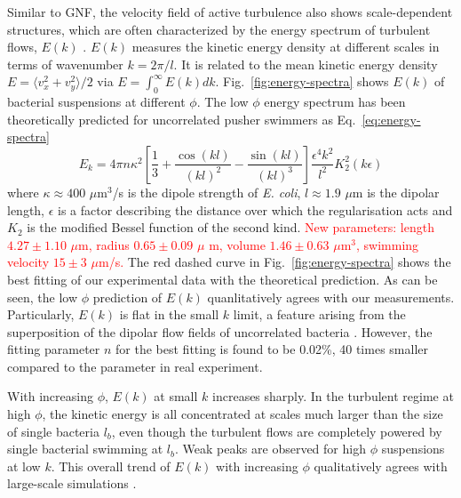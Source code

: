 \documentclass[twocolumn,aps,prx,amsmath,amssymb,longbibliography]{revtex4-2}
\begin{document}
Similar to GNF, the velocity field of active turbulence also shows scale-dependent structures, which are often characterized by the energy spectrum of turbulent flows, $E(k)$ \cite{Liu2020}. $E(k)$ measures the kinetic energy density at different scales in terms of wavenumber $k = 2\pi/l$. It is related to the mean kinetic energy density $E = \langle v_x^2 + v_y^2 \rangle/2$ via $E = \int_0^\infty E(k)dk$. Fig.~\ref{fig:energy-spectra} shows $E(k)$ of bacterial suspensions at different $\phi$. The low $\phi$ energy spectrum has been theoretically predicted for uncorrelated pusher swimmers \cite{Bardfalvy2019} as Eq.~\ref{eq:energy-spectra}
\begin{equation}
\label{eq:energy-spectra}
E_k = 4\pi n \kappa^2 \left[ \frac{1}{3} + \frac{\cos(kl)}{(kl)^2} - \frac{\sin(kl)}{(kl)^3} \right] \frac{\epsilon^4k^2}{l^2} K_2^2(k\epsilon)
\end{equation}
where  $\kappa \approx 400$ $\mu$m$^3$/s is the dipole strength of \textit{E. coli}, $l\approx 1.9$ $\mu$m is the dipolar length, $\epsilon$ is a factor describing the distance over which the regularisation acts and $K_2$ is the modified Bessel function of the second kind.
\textcolor{red}{New parameters: length $4.27\pm 1.10$ $\mu$m, radius $0.65\pm 0.09 $ $\mu$ m, volume $1.46\pm 0.63$ $\mu$m$^3$, swimming velocity $15\pm 3$ $\mu$m/s.}
The red dashed curve in Fig.~\ref{fig:energy-spectra} shows the best fitting of our experimental data with the theoretical prediction. As can be seen, the low $\phi$ prediction of $E(k)$ quanlitatively agrees with our measurements.
Particularly, $E(k)$ is flat in the small $k$ limit, a feature arising from the superposition of the dipolar flow fields of uncorrelated bacteria \cite{Bardfalvy2019}. However, the fitting parameter $n$ for the best fitting is found to be 0.02\%, 40 times smaller compared to the parameter in real experiment. %

With increasing $\phi$, $E(k)$ at small $k$ increases sharply. In the turbulent regime at high $\phi$, the kinetic energy is all concentrated at scales much larger than the size of single bacteria $l_b$, even though the turbulent flows are completely powered by single bacterial swimming at $l_b$. %
Weak peaks are observed for high $\phi$ suspensions at low $k$. This overall trend of $E(k)$ with increasing $\phi$ qualitatively agrees with large-scale simulations \cite{Saintillan2012,Bardfalvy2019}.
\end{document}
